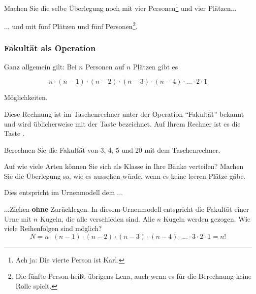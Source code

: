 Machen Sie die selbe Überlegung noch mit vier Personen\footnote{Ach ja: Die vierte Person ist Karl.} und vier
Plätzen...


... und mit fünf Plätzen und fünf Personen\footnote{Die fünfte Person heißt übrigens Lena, auch wenn es für die Berechnung keine Rolle spielt.}.

\newpage


\subsubsection{Fakultät als Operation}

Ganz allgemein gilt: Bei $n$ Personen auf $n$ Plätzen gibt es

$$n\cdot{} (n-1) \cdot{} (n-2) \cdot{} (n-3) \cdot{} (n-4) \cdot{}
... \cdot{} 2 \cdot{} 1$$

Möglichkeiten.

Diese Rechnung ist im Taschenrechner unter der Operation ``Fakultät''
bekannt und wird üblicherweise mit der Taste  bezeichnet. Auf
Ihrem Rechner ist es die Taste .

Berechnen Sie die Fakultät von 3, 4, 5 und 20 mit dem Taschenrechner.


Auf wie viele Arten können Sie sich als Klasse in Ihre Bänke
verteilen? Machen Sie die Überlegung so, wie es aussehen würde, wenn es keine leeren Plätze gäbe.


Dies entspricht im Urnenmodell dem ...
\begin{gesetz}{...Ziehen \textbf{ohne} Zurücklegen.}{}
In diesem Urnenmodell entspricht die Fakultät einer Urne mit $n$ Kugeln, die
alle verschieden sind. Alle $n$ Kugeln werden gezogen. Wie viele
Reihenfolgen sind möglich?
$$N = n\cdot{} (n-1) \cdot{} (n-2) \cdot{} (n-3) \cdot{}
(n-4) \cdot{} ... \cdot{} 3\cdot{} 2 \cdot{} 1 = n!$$
\end{gesetz}
\newpage


